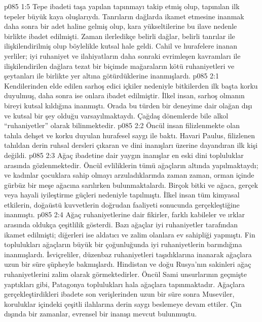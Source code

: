 \vs p085 1:5 Tepe ibadeti taşa yapılan tapınmayı takip etmiş olup, tapınılan ilk tepeler büyük kaya oluşlarıydı. Tanrıların dağlarda ikamet etmesine inanmak daha sonra bir adet haline gelmiş olup, kara yükseltilerine bu ilave nedenle birlikte ibadet edilmişti. Zaman ilerledikçe belirli dağlar, belirli tanrılar ile ilişkilendirilmiş olup böylelikle kutsal hale geldi. Cahil ve hurafelere inanan yerliler; iyi ruhaniyet ve ilahiyatların daha sonraki evrimleşen kavramları ile ilişkilendirilen dağlara tezat bir biçimde mağaraların kötü ruhaniyetleri ve şeytanları ile birlikte yer altına götürdüklerine inanmışlardı.
\vs p085 2:1 Kendilerinden elde edilen sarhoş edici içkiler nedeniyle bitkilerden ilk başta korku duyulmuş, daha sonra ise onlara ibadet edilmiştir. İlkel insan, sarhoş olmanın bireyi kutsal kıldığına inanmıştı. Orada bu türden bir deneyime dair olağan dışı ve kutsal bir şey olduğu varsayılmaktaydı. Çağdaş dönemlerde bile alkol “ruhaniyetler” olarak bilinmektedir.
\vs p085 2:2 Öncül insan filizlenmekte olan tahıla dehşet ve korku duyulan hurafesel saygı ile baktı. Havari Paulus, filizlenen tahıldan derin ruhsal dersleri çıkaran ve dini inanışları üzerine dayandıran ilk kişi değildi.
\vs p085 2:3 Ağaç ibadetine dair yaygın inanışlar en eski dini topluluklar arasında gözlenmektedir. Öncül evliliklerin tümü ağaçların altında yapılmaktaydı; ve kadınlar çocuklara sahip olmayı arzuladıklarında zaman zaman, orman içinde gürbüz bir meşe ağacına sarılırken bulunmaktalardı. Birçok bitki ve ağaca, gerçek veya hayali iyileştirme güçleri nedeniyle tapılmıştı. İlkel insan tüm kimyasal etkilerin, doğaüstü kuvvetlerin doğrudan faaliyeti sonucunda gerçekleştiğine inanmıştı.
\vs p085 2:4 Ağaç ruhaniyetlerine dair fikirler, farklı kabileler ve ırklar arasında oldukça çeşitlilik gösterdi. Bazı ağaçlar iyi ruhaniyetler tarafından ikamet edilmişti; diğerleri ise aldatıcı ve zalim olanlara ev sahipliği yapmıştı. Fin toplulukları ağaçların büyük bir çoğunluğunda iyi ruhaniyetlerin barındığına inanmışlardı. İsviçreliler, düzenbaz ruhaniyetleri taşıdıklarına inanarak ağaçlara uzun bir süre şüpheyle bakmışlardı. Hindistan ve doğu Rusya’nın sakinleri ağaç ruhaniyetlerini zalim olarak görmektedirler. Öncül Sami unsurlarının geçmişte yaptıkları gibi, Patagonya toplulukları hala ağaçlara tapınmaktadır. Ağaçlara gerçekleştirdikleri ibadete son verişlerinden uzun bir süre sonra Museviler, koruluklar içindeki çeşitli ilahlarına derin saygı beslemeye devam ettiler. Çin dışında bir zamanlar,  evrensel bir inanışı mevcut bulunmuştu.
